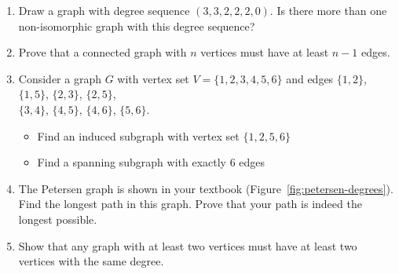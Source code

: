 \documentclass{article}
\theoremstyle{definition}
\begin{document}
\begin{enumerate}[resume]
\item Draw a graph with degree sequence $(3,3,2,2,2,0)$. Is there more than one non-isomorphic graph with this degree sequence?

\item Prove that a connected graph with $n$ vertices must have at least $n-1$ edges.

\item Consider a graph $G$ with vertex set $V = \{1,2,3,4,5,6\}$ and edges 
$\{1,2\}$, $\{1,5\}$, $\{2,3\}$, $\{2,5\}$,\\
$\{3,4\}$, $\{4,5\}$, $\{4,6\}$, $\{5,6\}$.
\begin{center}
\end{center}
\begin{itemize}
    \item Find an induced subgraph with vertex set $\{1,2,5,6\}$
    \item Find a spanning subgraph with exactly 6 edges
\end{itemize}

\item The Petersen graph is shown in your textbook (Figure~\ref{fig:petersen-degrees}). Find the longest path in this graph. Prove that your path is indeed the longest possible.

\item Show that any graph with at least two vertices must have at least two vertices with the same degree.

\end{enumerate}
\end{document}
